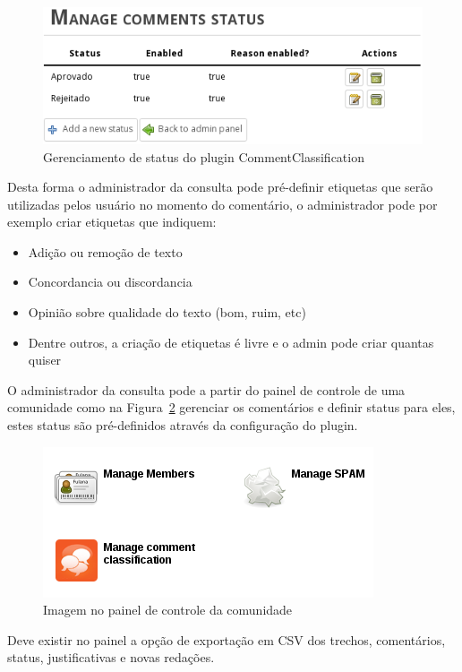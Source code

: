 \documentclass[12pt]{article}
\begin{document}
\begin{figure}[h]
\center
\includegraphics[scale=0.5]{manage-status.png}
\caption{Gerenciamento de status do plugin CommentClassification}
\label{manage-status}
\end{figure}

Desta forma o administrador da consulta pode pré-definir etiquetas que serão
utilizadas pelos usuário no momento do comentário, o administrador pode por
exemplo criar etiquetas que indiquem:

\begin{itemize}
  \item Adição ou remoção de texto
  \item Concordancia ou discordancia
  \item Opinião sobre qualidade do texto (bom, ruim, etc)
  \item Dentre outros, a criação de etiquetas é livre e o admin pode criar quantas quiser
\end{itemize}

O administrador da consulta pode a partir do painel de controle de uma
comunidade como na Figura~\ref{control-panel} gerenciar os comentários e
definir status para eles, estes status são pré-definidos através da
configuração do plugin.

\begin{figure}[h]
\center
\includegraphics[scale=0.5]{control-panel.png}
\caption{Imagem no painel de controle da comunidade}
\label{control-panel}
\end{figure}

Deve existir no painel a opção de exportação em CSV dos trechos, comentários,
status, justificativas e novas redações.
\end{document}
